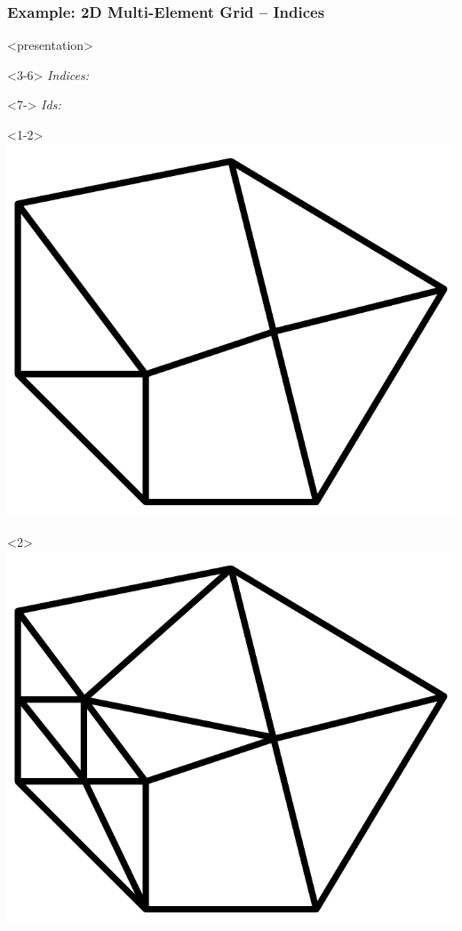 \documentclass[aspectratio=169,11pt]{beamer}
\theoremstyle{definition}
\begin{document}
\begin{frame}
  \frametitle{Example: 2D Multi-Element Grid -- Indices}

  \begin{onlyenv}<presentation>
    \vspace*{2ex}
    \begin{overlayarea}{\linewidth}{3ex}
      \medskip
      \begin{onlyenv}<3-6> \emph{Indices:}
      \end{onlyenv}
      \begin{onlyenv}<7-> \emph{Ids:}
      \end{onlyenv}
    \end{overlayarea}
  \end{onlyenv}

  \begin{overlayarea}{\linewidth}{0.45\linewidth}
    \begin{center}

    \begin{onlyenv}<1-2>
      \includegraphics[width=0.4\linewidth]{index-grid0}
      \hfill
      \begin{onlyenv}<2>
        \includegraphics[width=0.4\linewidth]{index-grid1}\par
      \end{onlyenv}
    \end{onlyenv}


\end{center}
\end{overlayarea}
\end{frame}
\end{document}
